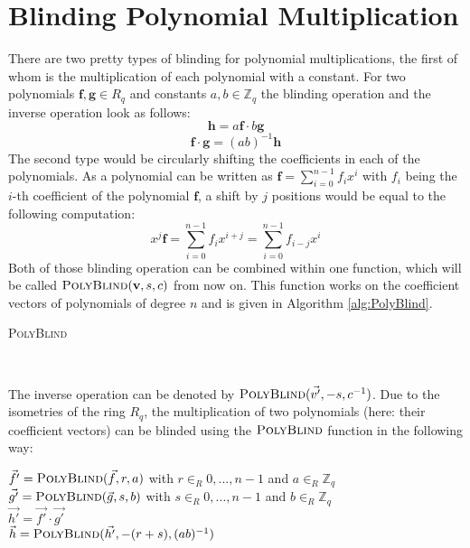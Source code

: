\section{Blinding Polynomial Multiplication}
There are two pretty types of blinding for polynomial multiplications, the first of whom is the multiplication of each polynomial with a constant. For two polynomials \(\textbf{f},\textbf{g} \in R_q\) and constants \(a,b \in \mathbb{Z}_q\) the blinding operation and the inverse operation look as follows:
\begin{equation}
    \textbf{h} = a \textbf{f} \cdot b \textbf{g}
\end{equation}
\begin{equation}
    \textbf{f} \cdot \textbf{g} = (ab)^{-1} \textbf{h}
\end{equation}
The second type would be circularly shifting the coefficients in each of the polynomials. As a polynomial can be written as \(\textbf{f} = \sum_{i=0}^{n-1} f_i x^i\) with \(f_i\) being the \(i\)-th coefficient of the polynomial \(\textbf{f}\), a shift by \(j\) positions would be equal to the following computation:
\begin{equation}
    x^j \textbf{f} = \sum_{i=0}^{n-1} f_i x^{i+j} = \sum_{i=0}^{n-1} f_{i-j} x^i
\end{equation}
Both of those blinding operation can be combined within one function, which will be called \(\textsc{PolyBlind}(\textbf{v},s,c)\) from now on. This function works on the coefficient vectors of polynomials of degree \(n\) and is given in Algorithm \ref{alg:PolyBlind}.\newline
\begin{algorithm}
    \caption{\textsc{PolyBlind}}
    \label{alg:PolyBlind}
    \begin{algorithmic}[1]
        \EndFor
        \EndFor\\
    \end{algorithmic}
\end{algorithm}
The inverse operation can be denoted by \(\textsc{PolyBlind}(\vec{v'},-s,c^{-1})\). Due to the isometries of the ring \(R_q\), the multiplication of two polynomials (here: their coefficient vectors) can be blinded using the \(\textsc{PolyBlind}\) function in the following way:
\begin{center}
    \(\vec{f'} = \textsc{PolyBlind}(\vec{f},r,a)\) with \(r \in_R {0,...,n-1}\) and \(a \in_R \mathbb{Z}_q\)\\
    \(\vec{g'} = \textsc{PolyBlind}(\vec{g},s,b)\) with \(s \in_R {0,...,n-1}\) and \(b \in_R \mathbb{Z}_q\)\\
    \(\vec{h'} = \vec{f'} \cdot \vec{g'}\)\\
    \(\vec{h} = \textsc{PolyBlind}(\vec{h'},-(r+s),(ab)^{-1})\)
\end{center}

